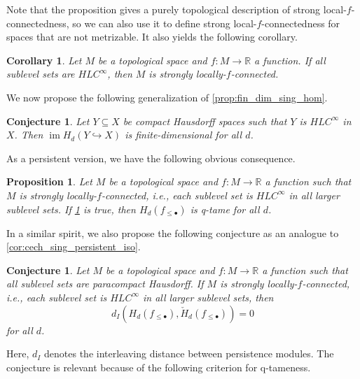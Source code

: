 \documentclass{amsart}
\theoremstyle{plain}
\newtheorem{cor}[thm]{Corollary}
\newtheorem{prop}[thm]{Proposition}
\newtheorem{conj}[thm]{Conjecture}
\theoremstyle{definition}
\DeclareMathOperator{\im}{im}
\newcommand\CH{\check{H}}
\begin{document}
Note that the proposition gives a purely topological description of strong local-$f$-connectedness, so we can also use it to define strong local-$f$-connectedness for spaces that are not metrizable. It also yields the following corollary.

\begin{cor}
Let $M$ be a topological space and $f\colon M\to\mathbb{R}$ a function. If all sublevel sets are $HLC^{\infty}$, then $M$ is strongly locally-$f$-connected.
\end{cor}

We now propose the following generalization of \cref{prop:fin_dim_sing_hom}.

\begin{conj}\label{conj:q-tame_singular}
Let $Y\subseteq X$ be compact Hausdorff spaces such that $Y$ is $HLC^{\infty}$ in $X$. Then $\im H_d(Y\hookrightarrow X)$ is finite-dimensional for all $d$.
\end{conj}

As a persistent version, we have the following obvious consequence.

\begin{prop}\label{prop:q-tame_singular}
Let $M$ be a topological space and $f\colon M\to\mathbb{R}$ a function such that $M$ is strongly locally-$f$-connected, i.e., each sublevel set is $HLC^{\infty}$ in all larger sublevel sets. If \cref{conj:q-tame_singular} is true, then $H_{d}(f_{\leq\bullet})$ is q-tame for all $d$.
\end{prop}

In a similar spirit, we also propose the following conjecture as an analogue to \cref{cor:cech_sing_persistent_iso}.

\begin{conj}\label{con:d_I_0_sing_cech}
Let $M$ be a topological space and $f\colon M\to\mathbb{R}$ a function such that all sublevel sets are paracompact Hausdorff. If $M$ is strongly locally-$f$-connected, i.e., each sublevel set is $HLC^{\infty}$ in all larger sublevel sets, then 
\[
d_I(H_d(f_{\leq\bullet}),\CH_d(f_{\leq\bullet}))=0
\]
for all $d$.
\end{conj}

Here, $d_{I}$ denotes the interleaving distance between persistence modules. The conjecture is relevant because of the following criterion for q-tameness.
\end{document}
